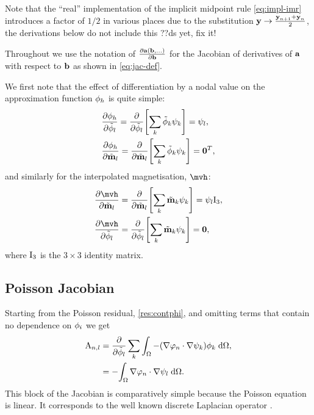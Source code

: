 Note that the ``real'' implementation of the implicit midpoint rule \cref{eq:impl-imr} introduces a factor of $1/2$ in various places due to the substitution $ \boldsymbol{\mathrm{y}} \rightarrow \frac{\boldsymbol{\mathrm{y}}_{n+1} + \boldsymbol{\mathrm{y}}_n}{2}$, the derivations below do not include this ??ds yet, fix it!

Throughout  we use the notation of $\frac{\partial {\boldsymbol{\mathrm{a}}}({\boldsymbol{\mathrm{b}}}, \ldots)}{\partial {\boldsymbol{\mathrm{b}}}}$ for the Jacobian of derivatives of ${\boldsymbol{\mathrm{a}}}$ with respect to ${\boldsymbol{\mathrm{b}}}$ as shown in \cref{eq:jac-def}.

We first note that the effect of differentiation by a nodal value on the approximation function ${\phi}_h$ is quite simple:
\begin{equation}
  \begin{aligned}
    &\frac{\partial {\phi}_h}{\partial \tilde{\phi}_l} = \frac{\partial }{\partial \tilde{\phi}_l} {\left[  \sum_k \tilde{\phi}_k {\psi_k}  \right]} = \psi_l, \\
    &\frac{\partial {\phi}_h}{\partial \tilde{\boldsymbol{\mathrm{m}}}_l} = \frac{\partial }{\partial \tilde{\boldsymbol{\mathrm{m}}}_l} {\left[  \sum_k \tilde{\phi}_k {\psi_k}  \right]} = \mathbf{0}^T, \\
  \end{aligned}
\end{equation}
and similarly for the interpolated magnetisation, $\mvh$:
\begin{equation}
  \begin{aligned}
    &\pd{\mvh}{\mvdis_l} = \pd{}{\mvdis_l} \bigs{ \sum_k \mvdis_k \sk } = \sbf_l \Idm_3, \\
    &\pd{\mvh}{\phimdis_l} = \pd{}{\phimdis_l} \bigs{ \sum_k \mvdis_k \sk } = \zerov, \\
\end{aligned}
\end{equation}
where $\mathrm{I}_3$ is the $3\times3$ identity matrix.

\subsection{Poisson Jacobian}
\label{sec:poisson-jacobian}

Starting from the Poisson residual, \cref{res:contphi}, and omitting terms that contain no dependence on $\phi_i$ we get
\begin{equation}
  \begin{aligned}
    \label{eq:poisson-jacobian}
    \mathrm{A}_{n,l} &= \frac{\partial }{\partial \tilde{\phi}_l} \sum_k {\int_{\Omega} { -(\nabla \varphi_n \cdot \nabla \psi_k) \phi_{k}} {\; \mathrm{{d}}} {\Omega}}, \\
    &= -{\int_{\Omega} {\nabla \varphi_n \cdot \nabla \psi_l} {\; \mathrm{{d}}} {\Omega}}.
  \end{aligned}
\end{equation}
This block of the Jacobian is comparatively simple because the Poisson equation is linear.
It corresponds to the well known discrete Laplacian operator \cite{HowardElmanDavidSilvester2006}.



